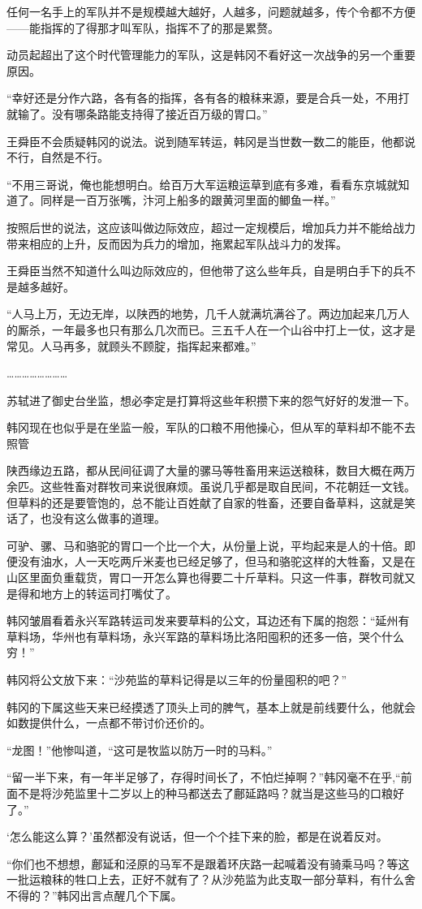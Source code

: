 任何一名手上的军队并不是规模越大越好，人越多，问题就越多，传个令都不方便——能指挥的了得那才叫军队，指挥不了的那是累赘。

动员起超出了这个时代管理能力的军队，这是韩冈不看好这一次战争的另一个重要原因。

“幸好还是分作六路，各有各的指挥，各有各的粮秣来源，要是合兵一处，不用打就输了。没有哪条路能支持得了接近百万级的胃口。”

王舜臣不会质疑韩冈的说法。说到随军转运，韩冈是当世数一数二的能臣，他都说不行，自然是不行。

“不用三哥说，俺也能想明白。给百万大军运粮运草到底有多难，看看东京城就知道了。同样是一百万张嘴，汴河上船多的跟黄河里面的鲫鱼一样。”

按照后世的说法，这应该叫做边际效应，超过一定规模后，增加兵力并不能给战力带来相应的上升，反而因为兵力的增加，拖累起军队战斗力的发挥。

王舜臣当然不知道什么叫边际效应的，但他带了这么些年兵，自是明白手下的兵不是越多越好。

“人马上万，无边无岸，以陕西的地势，几千人就满坑满谷了。两边加起来几万人的厮杀，一年最多也只有那么几次而已。三五千人在一个山谷中打上一仗，这才是常见。人马再多，就顾头不顾腚，指挥起来都难。”

……………………

苏轼进了御史台坐监，想必李定是打算将这些年积攒下来的怨气好好的发泄一下。

韩冈现在也似乎是在坐监一般，军队的口粮不用他操心，但从军的草料却不能不去照管

陕西缘边五路，都从民间征调了大量的骡马等牲畜用来运送粮秣，数目大概在两万余匹。这些牲畜对群牧司来说很麻烦。虽说几乎都是取自民间，不花朝廷一文钱。但草料的还是要管饱的，总不能让百姓献了自家的牲畜，还要自备草料，这就是笑话了，也没有这么做事的道理。

可驴、骡、马和骆驼的胃口一个比一个大，从份量上说，平均起来是人的十倍。即便没有油水，人一天吃两斤米麦也已经足够了，但马和骆驼这样的大牲畜，又是在山区里面负重载货，胃口一开怎么算也得要二十斤草料。只这一件事，群牧司就又是得和地方上的转运司打嘴仗了。

韩冈皱眉看着永兴军路转运司发来要草料的公文，耳边还有下属的抱怨：“延州有草料场，华州也有草料场，永兴军路的草料场比洛阳囤积的还多一倍，哭个什么穷！”

韩冈将公文放下来：“沙苑监的草料记得是以三年的份量囤积的吧？”

韩冈的下属这些天来已经摸透了顶头上司的脾气，基本上就是前线要什么，他就会如数提供什么，一点都不带讨价还价的。

“龙图！”他惨叫道，“这可是牧监以防万一时的马料。”

“留一半下来，有一年半足够了，存得时间长了，不怕烂掉啊？”韩冈毫不在乎,“前面不是将沙苑监里十二岁以上的种马都送去了鄜延路吗？就当是这些马的口粮好了。”

‘怎么能这么算？’虽然都没有说话，但一个个挂下来的脸，都是在说着反对。

“你们也不想想，鄜延和泾原的马军不是跟着环庆路一起喊着没有骑乘马吗？等这一批运粮秣的牲口上去，正好不就有了？从沙苑监为此支取一部分草料，有什么舍不得的？”韩冈出言点醒几个下属。

